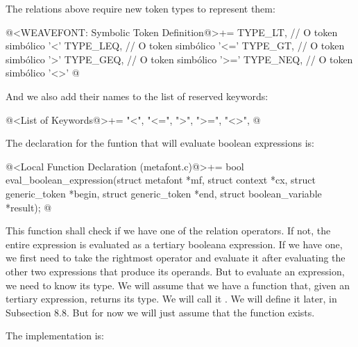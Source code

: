{{{{{The relations above require new token types to represent them:

\iniciocodigo
@<WEAVEFONT: Symbolic Token Definition@>+=
TYPE_LT,                    // O token simbólico '<'
TYPE_LEQ,                   // O token simbólico '<='
TYPE_GT,                    // O token simbólico '>'
TYPE_GEQ,                   // O token simbólico '>='
TYPE_NEQ,                   // O token simbólico '<>'
@
\fimcodigo

And we also add their names to the list of reserved keywords:

\iniciocodigo
@<List of Keywords@>+=
"<", "<=", ">", ">=", "<>",
@
\fimcodigo

The declaration for the funtion that will evaluate boolean expressions
is:

\iniciocodigo
@<Local Function Declaration (metafont.c)@>+=
bool eval_boolean_expression(struct metafont *mf, struct context *cx,
                             struct generic_token *begin,
                             struct generic_token *end,
                             struct boolean_variable *result);
@
\fimcodigo

This function shall check if we have one of the relation operators. If
not, the entire expression is evaluated as a tertiary booleana
expression. If we have one, we first need to take the rightmost
operator and evaluate it after evaluating the other two expressions
that produce its operands. But to evaluate an expression, we need to
know its type. We will assume that we have a function that, given an
tertiary expression, returns its type. We will call
it . We will define it
later, in Subsection 8.8. But for now we will just assume that the
function exists.

The implementation is:

}}}}}
